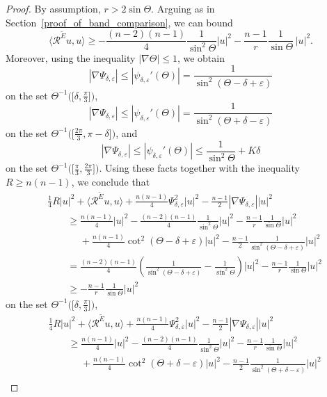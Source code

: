 \documentclass[pdftex]{sigma}
\numberwithin{equation}{section}
\begin{document}
\begin{proof}
By assumption, $r > 2 \sin \Theta$. Arguing as in Section~\ref{proof_of_band_comparison}, we can bound
\[
 \big\langle \mathcal{R}^{\tilde{E}} u,u \big\rangle \geq -\frac{(n-2)(n-1)}{4} \frac{1}{\sin^2 \Theta} |u|^2 - \frac{n-1}{r} \frac{1}{\sin \Theta} \, |u|^2.
\]
Moreover, using the inequality $|\nabla \Theta| \leq 1$, we obtain
\[|\nabla \Psi_{\delta,\varepsilon}| \leq |\psi_{\delta,\varepsilon}'(\Theta)| = \frac{1}{\sin^2(\Theta-\delta+\varepsilon)}\]
on the set $\Theta^{-1}\big(\big[\delta,\frac{\pi}{3}\big]\big)$,
\[|\nabla \Psi_{\delta,\varepsilon}| \leq |\psi_{\delta,\varepsilon}'(\Theta)| = \frac{1}{\sin^2(\Theta+\delta-\varepsilon)}\]
on the set $\Theta^{-1}\big(\big[\frac{2\pi}{3},\pi-\delta\big]\big)$, and
\[|\nabla \Psi_{\delta,\varepsilon}| \leq |\psi_{\delta,\varepsilon}'(\Theta)| \leq \frac{1}{\sin^2 \Theta} + K\delta\]
on the set $\Theta^{-1}\big(\big[\frac{\pi}{3},\frac{2\pi}{3}\big]\big)$. Using these facts together with the inequality $R \geq n(n-1)$, we conclude that
\begin{align*}
&\frac{1}{4} R |u|^2 + \big\langle \mathcal{R}^{\tilde{E}} u,u \big\rangle + \frac{n(n-1)}{4} \Psi_{\delta,\varepsilon}^2 |u|^2 - \frac{n-1}{2} |\nabla \Psi_{\delta,\varepsilon}| |u|^2 \\
&\qquad\geq \frac{n(n-1)}{4} |u|^2 - \frac{(n-2)(n-1)}{4} \frac{1}{\sin^2 \Theta} |u|^2 - \frac{n-1}{r} \frac{1}{\sin \Theta} |u|^2 \\
&\phantom{\qquad\geq}{} + \frac{n(n-1)}{4} \cot^2 (\Theta-\delta+\varepsilon) |u|^2 - \frac{n-1}{2} \frac{1}{\sin^2 (\Theta-\delta+\varepsilon)} |u|^2 \\
&\qquad= \frac{(n-2)(n-1)}{4} \left( \frac{1}{\sin^2 (\Theta-\delta+\varepsilon)} - \frac{1}{\sin^2 \Theta} \right) |u|^2 - \frac{n-1}{r} \frac{1}{\sin \Theta} |u|^2 \\
&\qquad\geq -\frac{n-1}{r} \frac{1}{\sin \Theta} |u|^2
\end{align*}
on the set $\Theta^{-1}\big(\big[\delta,\frac{\pi}{3}\big]\big)$,
\begin{align*}
&\frac{1}{4} R |u|^2 + \big\langle \mathcal{R}^{\tilde{E}} u,u \big\rangle + \frac{n(n-1)}{4} \Psi_{\delta,\varepsilon}^2 |u|^2 - \frac{n-1}{2} |\nabla \Psi_{\delta,\varepsilon}| |u|^2 \\
&\qquad\geq \frac{n(n-1)}{4} |u|^2 - \frac{(n-2)(n-1)}{4} \frac{1}{\sin^2 \Theta} |u|^2 - \frac{n-1}{r} \frac{1}{\sin \Theta} |u|^2 \\
&\phantom{\qquad\geq}{} + \frac{n(n-1)}{4} \cot^2 (\Theta+\delta-\varepsilon) |u|^2 - \frac{n-1}{2} \frac{1}{\sin^2 (\Theta+\delta-\varepsilon)} |u|^2 \\

\end{align*}
\end{proof}
\end{document}
